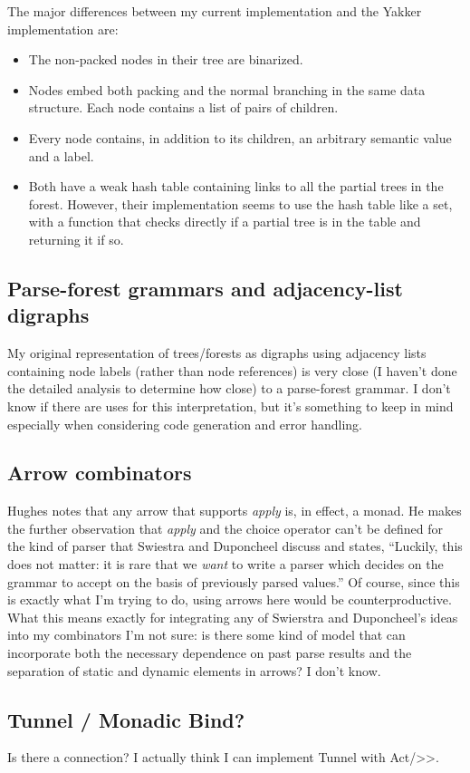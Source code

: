 \documentclass[12pt]{article}
\begin{document}
The major differences between my current implementation and the Yakker
implementation are:

\begin{itemize}
\item The non-packed nodes in their tree are binarized.
\item Nodes embed both packing and the normal branching in the same
  data structure.  Each node contains a list of pairs of children.
\item Every node contains, in addition to its children, an arbitrary
  semantic value and a label.
\item Both have a weak hash table containing links to all the partial
  trees in the forest.  However, their implementation seems to use the
  hash table like a set, with a function that checks directly if a
  partial tree is in the table and returning it if so.
\end{itemize}

\subsection{Parse-forest grammars and adjacency-list digraphs}
\label{sec:parse-forest_grammars_adjacency-list_digraphs}

My original representation of trees/forests as digraphs using
adjacency lists containing node labels (rather than node references)
is very close (I haven't done the detailed analysis to determine how
close) to a parse-forest grammar.  I don't know if there are uses for
this interpretation, but it's something to keep in mind especially
when considering code generation and error handling.

\subsection{Arrow combinators}
\label{sec:arrow_combinators}

Hughes notes that any arrow that supports \emph{apply} is, in effect,
a monad.  He makes the further observation that \emph{apply} and the
choice operator can't be defined for the kind of parser that Swiestra
and Duponcheel discuss and states, ``Luckily, this does not matter: it
is rare that we \emph{want} to write a parser which decides on the
grammar to accept on the basis of previously parsed values.''  Of
course, since this is exactly what I'm trying to do, using arrows here
would be counterproductive.  What this means exactly for integrating
any of Swierstra and Duponcheel's ideas into my combinators I'm not
sure: is there some kind of model that can incorporate both the
necessary dependence on past parse results and the separation of
static and dynamic elements in arrows?  I don't know.

\subsection{Tunnel / Monadic Bind?}
\label{sec:tunnel_bind}

Is there a connection?  I actually think I can implement Tunnel with
Act/>>.

\printbibliography
\end{document}
